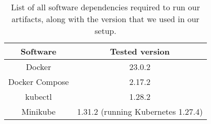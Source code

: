\begin{table}
\renewcommand{\arraystretch}{1.2}
  \centering
  \begin{tabular}{ | c | c | }
    \hline
    Software                    & Tested version                            \\
    \hline
    \hline
    Docker                      & 23.0.2                                    \\
    \hline
    Docker Compose              & 2.17.2                                    \\
    \hline
    kubectl                     & 1.28.2                                    \\
    \hline
    Minikube                    & 1.31.2 (running Kubernetes 1.27.4)        \\
    \hline
  \end{tabular}
  \vspace{0.2cm}
  \caption{List of all software dependencies required to run our artifacts, along with the version that we used in our setup.}
  \label{tbl:artifact-sw}
\end{table}
%


